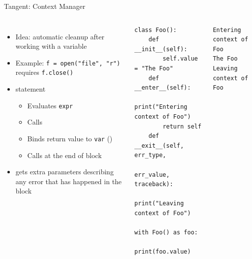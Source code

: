 
\begin{frame}[fragile]{Tangent: Context Manager}
%
\begin{columns}[T]
\vspace{-6pt}
\begin{itemize}
\item Idea: automatic cleanup after working with a variable
\item Example: \texttt{f = open("file", "r")} requires \texttt{f.close()}
\item {} statement
	\begin{itemize}
	\item Evaluates \texttt{expr}
	\item Calls 
	\item Binds return value to \texttt{var} ()
	\item Calls  at the end of  block
	\end{itemize}
\item {} gets extra parameters describing any error that has happened in the  block
\end{itemize}
%
\vspace{-34pt}
\begin{codebox}
\begin{verbatim}
class Foo():
    def __init__(self):
        self.value = "The Foo"
    def __enter__(self):
        print("Entering context of Foo")
        return self
    def __exit__(self, err_type, 
                 err_value, traceback):
        print("Leaving context of Foo")

with Foo() as foo:
    print(foo.value)
\end{verbatim}
\end{codebox}
%
\begin{cmdbox}
\begin{verbatim}
Entering context of Foo
The Foo
Leaving context of Foo
\end{verbatim}
\end{cmdbox}
\end{columns}
%
\end{frame}


